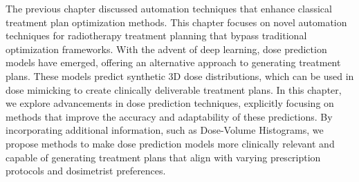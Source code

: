 The previous chapter discussed automation techniques that enhance classical treatment plan optimization methods.
This chapter focuses on novel automation techniques for radiotherapy treatment planning that bypass traditional optimization frameworks.
With the advent of deep learning, dose prediction models have emerged, offering an alternative approach to generating treatment plans.
These models predict synthetic 3D dose distributions, which can be used in dose mimicking to create clinically deliverable treatment plans.
In this chapter, we explore advancements in dose prediction techniques, explicitly focusing on methods that improve the accuracy and adaptability of these predictions.
By incorporating additional information, such as Dose-Volume Histograms, we propose methods to make dose prediction models more clinically relevant and capable of generating treatment plans that align with varying prescription protocols and dosimetrist preferences.
